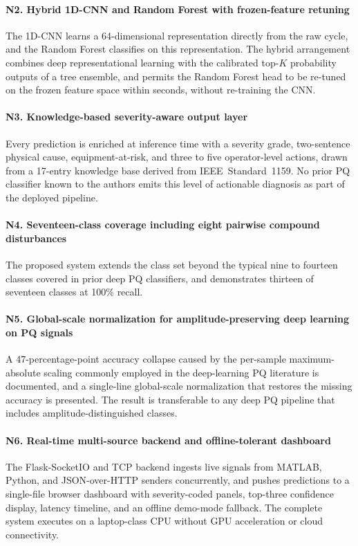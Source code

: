 \documentclass[conference]{IEEEtran}
\begin{document}
\paragraph{N2. Hybrid 1D-CNN and Random Forest with frozen-feature
retuning}
The 1D-CNN learns a 64-dimensional representation directly from the
raw cycle, and the Random Forest classifies on this representation.
The hybrid arrangement combines deep representational learning with
the calibrated top-$K$ probability outputs of a tree ensemble, and
permits the Random Forest head to be re-tuned on the frozen feature
space within seconds, without re-training the CNN.

\paragraph{N3. Knowledge-based severity-aware output layer}
Every prediction is enriched at inference time with a severity grade,
two-sentence physical cause, equipment-at-risk, and three to five
operator-level actions, drawn from a 17-entry knowledge base derived
from IEEE~Standard~1159. No prior PQ classifier known to the authors
emits this level of actionable diagnosis as part of the deployed
pipeline.

\paragraph{N4. Seventeen-class coverage including eight pairwise
compound disturbances}
The proposed system extends the class set beyond the typical nine to
fourteen classes covered in prior deep PQ classifiers, and demonstrates
thirteen of seventeen classes at 100\% recall.

\paragraph{N5. Global-scale normalization for amplitude-preserving
deep learning on PQ signals}
A 47-percentage-point accuracy collapse caused by the per-sample
maximum-absolute scaling commonly employed in the deep-learning PQ
literature is documented, and a single-line global-scale normalization
that restores the missing accuracy is presented. The result is
transferable to any deep PQ pipeline that includes
amplitude-distinguished classes.

\paragraph{N6. Real-time multi-source backend and offline-tolerant
dashboard}
The Flask-SocketIO and TCP backend ingests live signals from MATLAB,
Python, and JSON-over-HTTP senders concurrently, and pushes
predictions to a single-file browser dashboard with severity-coded
panels, top-three confidence display, latency timeline, and an offline
demo-mode fallback. The complete system executes on a laptop-class
CPU without GPU acceleration or cloud connectivity.
\end{document}
